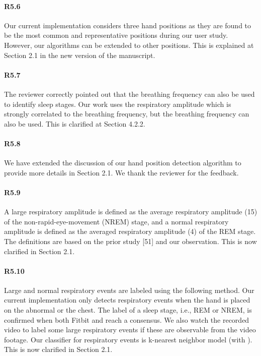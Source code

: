 \paragraph{R5.6} Our current implementation considers three hand positions as they are found to be the most common and representative
positions during our user study. However, our algorithms can be extended to other positions. This is explained at Section 2.1 in the new
version of the manuscript.

\paragraph{R5.7} The reviewer correctly pointed out that the breathing frequency can also be used to identify sleep stages. Our work uses
the respiratory amplitude which is strongly correlated to the breathing frequency, but the breathing frequency can also be used. This is
clarified at Section 4.2.2.

\paragraph{R5.8} We have extended the discussion of our hand position detection algorithm to provide more details in Section 2.1. We
thank the reviewer for the feedback.

\paragraph{R5.9} A large respiratory amplitude is defined as the average respiratory amplitude (15) of the
non-rapid-eye-movement (NREM) stage, and a normal respiratory amplitude is defined as the averaged respiratory amplitude (4) of the REM
stage. The definitions are based on the prior study [51] and our observation. This is now clarified in Section 2.1.


\paragraph{R5.10} Large and normal respiratory events are labeled using the following method. Our current implementation only detects
respiratory events when the hand is placed on the abnormal or the chest. The label of a sleep stage, i.e., REM or NREM, is confirmed when
both Fitbit and \systemname reach a consensus. We also watch the recorded video to label some large respiratory events if these are
observable from the video footage. Our classifier for respiratory events is k-nearest neighbor model (with ). This is now
clarified in Section 2.1.


